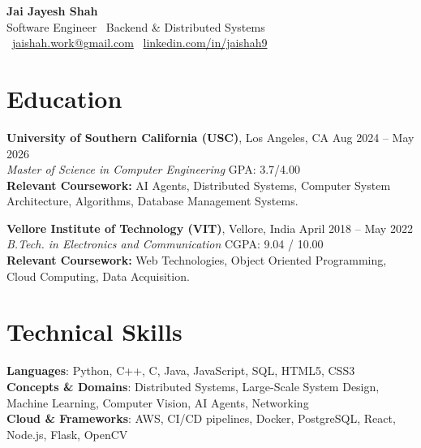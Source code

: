 \documentclass[letterpaper,11pt]{article}
\begin{document}
\begin{center}
    {\LARGE \textbf{Jai Jayesh Shah}}\\
    {\normalsize Software Engineer \textbar\ Backend \& Distributed Systems}\\
    \small
    \faEnvelope\ \href{mailto:jaishah.work@gmail.com}{jaishah.work@gmail.com}
    \quad
    \faLinkedin\ \href{https://www.linkedin.com/in/jaishah9}{linkedin.com/in/jaishah9}
\end{center}
\vspace{-13pt}


\section*{Education}
\textbf{University of Southern California (USC)}, Los Angeles, CA \hfill Aug 2024 -- May 2026 \\
\textit{Master of Science in Computer Engineering} \hfill GPA: 3.7/4.00 \\
\textbf{Relevant Coursework:} AI Agents, Distributed Systems, Computer System Architecture, Algorithms, Database Management Systems.

\vspace{3pt}
\textbf{Vellore Institute of Technology (VIT)}, Vellore, India \hfill April 2018 -- May 2022 \\
\textit{B.Tech. in Electronics and Communication} \hfill CGPA: 9.04 / 10.00 \\
\textbf{Relevant Coursework:} Web Technologies, Object Oriented Programming, Cloud Computing, Data Acquisition.

\section*{Technical Skills}
\begin{itemize}[leftmargin=0.15in, label={}]
    {\item{
     \textbf{Languages}{: Python, C++, C, Java, JavaScript, SQL, HTML5, CSS3} \\
     \textbf{Concepts \& Domains}{: Distributed Systems, Large-Scale System Design, Machine Learning, Computer Vision, AI Agents, Networking} \\
     \textbf{Cloud \& Frameworks}{: AWS, CI/CD pipelines, Docker, PostgreSQL, React, Node.js, Flask, OpenCV}
    }}
\end{itemize}

\end{document}
